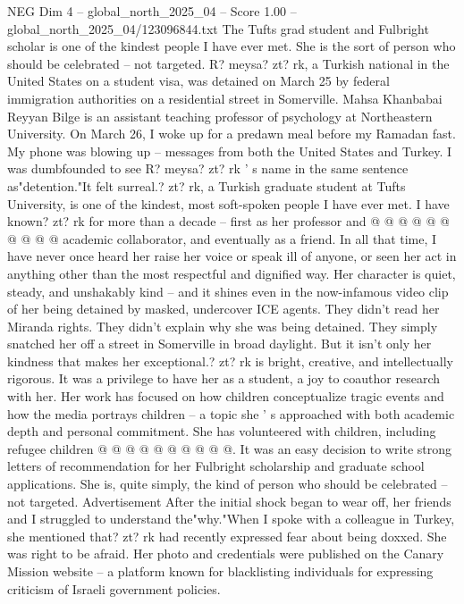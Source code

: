\begin{textsample}{NEG Dim 4 – global\_north\_2025\_04 – Score 1.00 – global\_north\_2025\_04/123096844.txt}  \label{ex:f4_neg_250}
The Tufts grad student and Fulbright scholar is one of the kindest people I have ever met.
She is the sort of person who should be celebrated -- not targeted.
R? meysa? zt? rk, a Turkish national in the United States on a student visa, was detained on March 25 by federal immigration authorities on a residential street in Somerville.
Mahsa Khanbabai Reyyan Bilge is an assistant teaching professor of psychology at Northeastern University.
On March 26, I woke up for a predawn meal before my Ramadan fast.
My phone was blowing up -- messages from both the United States and Turkey.
I was dumbfounded to see R? meysa? zt? rk ' s name in the same sentence as"detention."It felt surreal.? zt? rk, a Turkish graduate student at Tufts University, is one of the kindest, most soft-spoken people I have ever met.
I have known? zt? rk for more than a decade -- first as her professor and @ @ @ @ @ @ @ @ @ @ academic collaborator, and eventually as a friend.
In all that time, I have never once heard her raise her voice or speak ill of anyone, or seen her act in anything other than the most respectful and dignified way.
Her character is quiet, steady, and unshakably kind -- and it shines even in the now-infamous video clip of her being detained by masked, undercover ICE agents.
They didn't read her Miranda rights.
They didn't explain why she was being detained.
They simply snatched her off a street in Somerville in broad daylight.
But it isn't only her kindness that makes her exceptional.? zt? rk is bright, creative, and intellectually rigorous.
It was a privilege to have her as a student, a joy to coauthor research with her.
Her work has focused on how children conceptualize tragic events and how the media portrays children -- a topic she ' s approached with both academic depth and personal commitment.
She has volunteered with children, including refugee children @ @ @ @ @ @ @ @ @ @.
It was an easy decision to write strong letters of recommendation for her Fulbright scholarship and graduate school applications.
She is, quite simply, the kind of person who should be celebrated -- not targeted.
Advertisement After the initial shock began to wear off, her friends and I struggled to understand the"why."When I spoke with a colleague in Turkey, she mentioned that? zt? rk had recently expressed fear about being doxxed.
She was right to be afraid.
Her photo and credentials were published on the Canary Mission website -- a platform known for blacklisting individuals for expressing criticism of Israeli government policies.

\end{textsample}
